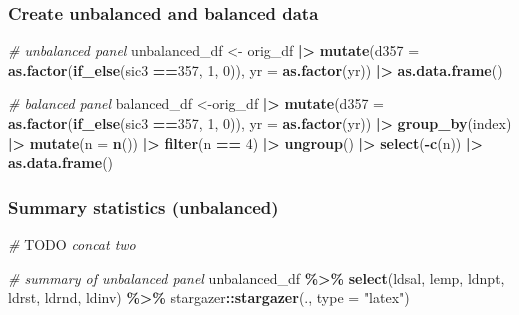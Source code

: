 \documentclass[
]{article}
\newenvironment{Shaded}{\begin{snugshade}}{\end{snugshade}}
\newcommand{\AlertTok}[1]{\textcolor[rgb]{0.94,0.16,0.16}{#1}}
\newcommand{\AttributeTok}[1]{\textcolor[rgb]{0.13,0.29,0.53}{#1}}
\newcommand{\CommentTok}[1]{\textcolor[rgb]{0.56,0.35,0.01}{\textit{#1}}}
\newcommand{\DecValTok}[1]{\textcolor[rgb]{0.00,0.00,0.81}{#1}}
\newcommand{\FunctionTok}[1]{\textcolor[rgb]{0.13,0.29,0.53}{\textbf{#1}}}
\newcommand{\NormalTok}[1]{#1}
\newcommand{\OtherTok}[1]{\textcolor[rgb]{0.56,0.35,0.01}{#1}}
\newcommand{\SpecialCharTok}[1]{\textcolor[rgb]{0.81,0.36,0.00}{\textbf{#1}}}
\newcommand{\StringTok}[1]{\textcolor[rgb]{0.31,0.60,0.02}{#1}}
\begin{document}
\hypertarget{create-unbalanced-and-balanced-data}{%
\subsubsection{Create unbalanced and balanced
data}\label{create-unbalanced-and-balanced-data}}

\begin{Shaded}
\begin{Highlighting}[]
\CommentTok{\# unbalanced panel}
\NormalTok{unbalanced\_df }\OtherTok{\textless{}{-}}\NormalTok{ orig\_df }\SpecialCharTok{|\textgreater{}}
  \FunctionTok{mutate}\NormalTok{(}\AttributeTok{d357 =} \FunctionTok{as.factor}\NormalTok{(}\FunctionTok{if\_else}\NormalTok{(sic3 }\SpecialCharTok{==}\DecValTok{357}\NormalTok{, }\DecValTok{1}\NormalTok{, }\DecValTok{0}\NormalTok{)),}
         \AttributeTok{yr =} \FunctionTok{as.factor}\NormalTok{(yr)) }\SpecialCharTok{|\textgreater{}}
  \FunctionTok{as.data.frame}\NormalTok{()}

\CommentTok{\# balanced panel}
\NormalTok{balanced\_df }\OtherTok{\textless{}{-}}\NormalTok{orig\_df }\SpecialCharTok{|\textgreater{}}
  \FunctionTok{mutate}\NormalTok{(}\AttributeTok{d357 =} \FunctionTok{as.factor}\NormalTok{(}\FunctionTok{if\_else}\NormalTok{(sic3 }\SpecialCharTok{==}\DecValTok{357}\NormalTok{, }\DecValTok{1}\NormalTok{, }\DecValTok{0}\NormalTok{)),}
         \AttributeTok{yr =} \FunctionTok{as.factor}\NormalTok{(yr)) }\SpecialCharTok{|\textgreater{}}
  \FunctionTok{group\_by}\NormalTok{(index) }\SpecialCharTok{|\textgreater{}}
  \FunctionTok{mutate}\NormalTok{(}\AttributeTok{n =} \FunctionTok{n}\NormalTok{()) }\SpecialCharTok{|\textgreater{}}
  \FunctionTok{filter}\NormalTok{(n }\SpecialCharTok{==} \DecValTok{4}\NormalTok{) }\SpecialCharTok{|\textgreater{}}
  \FunctionTok{ungroup}\NormalTok{() }\SpecialCharTok{|\textgreater{}}
  \FunctionTok{select}\NormalTok{(}\SpecialCharTok{{-}}\FunctionTok{c}\NormalTok{(n)) }\SpecialCharTok{|\textgreater{}}
  \FunctionTok{as.data.frame}\NormalTok{()}
\end{Highlighting}
\end{Shaded}

\hypertarget{summary-statistics-unbalanced}{%
\subsubsection{Summary statistics
(unbalanced)}\label{summary-statistics-unbalanced}}

\begin{Shaded}
\begin{Highlighting}[]
\CommentTok{\# }\AlertTok{TODO}\CommentTok{ concat two }

\CommentTok{\# summary of unbalanced panel}
\NormalTok{unbalanced\_df }\SpecialCharTok{\%\textgreater{}\%}
  \FunctionTok{select}\NormalTok{(ldsal, lemp, ldnpt, ldrst, ldrnd, ldinv) }\SpecialCharTok{\%\textgreater{}\%}
\NormalTok{  stargazer}\SpecialCharTok{::}\FunctionTok{stargazer}\NormalTok{(., }\AttributeTok{type =} \StringTok{"latex"}\NormalTok{)}
\end{Highlighting}
\end{Shaded}
\end{document}
